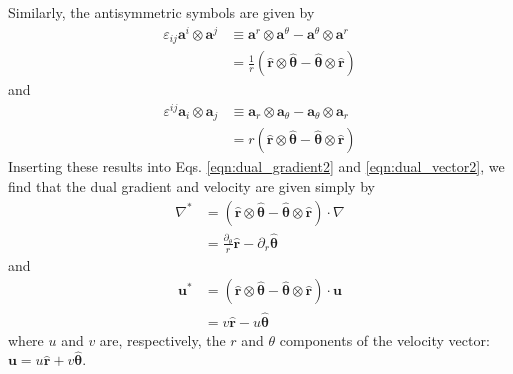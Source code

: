 \documentclass[%
 reprint,
superscriptaddress,
longbibliography,
 amsmath,amssymb,
 prl,
 citeautoscript,
]{revtex4-1}
\begin{document}
Similarly, the antisymmetric symbols are given by
\begin{equation}
\begin{split}
\varepsilon_{ij} {\boldsymbol a}^i \otimes {\boldsymbol a}^j &\equiv {\boldsymbol a}^r \otimes {\boldsymbol a}^{\theta} - {\boldsymbol a}^{\theta} \otimes {\boldsymbol a}^r \\
&= \frac{1}{r} \left( \hat{\boldsymbol r} \otimes \hat{\boldsymbol \theta} - \hat{\boldsymbol \theta} \otimes \hat{\boldsymbol r} \right)
\end{split}
\label{eqn:eij1}
\end{equation}
and
\begin{equation}
\begin{split}
\varepsilon^{ij} {\boldsymbol a}_i \otimes {\boldsymbol a}_j &\equiv {\boldsymbol a}_r \otimes {\boldsymbol a}_{\theta} - {\boldsymbol a}_{\theta} \otimes {\boldsymbol a}_r \\
&= r \left( \hat{\boldsymbol r} \otimes \hat{\boldsymbol \theta} - \hat{\boldsymbol \theta} \otimes \hat{\boldsymbol r} \right)
\end{split}
\label{eqn:eij2}
\end{equation}
Inserting these results into Eqs. \ref{eqn:dual_gradient2} and \ref{eqn:dual_vector2}, we find that the dual gradient and velocity are given simply by
\begin{equation}
\begin{split}
\nabla^* &= \left( \hat{\boldsymbol r} \otimes \hat{\boldsymbol \theta} - \hat{\boldsymbol \theta} \otimes \hat{\boldsymbol r} \right) \cdot \nabla \\
&= \frac{\partial_{\theta}}{r} \hat{\boldsymbol r} - \partial_r \hat{\boldsymbol \theta}
\end{split}
\label{eqn:dual_gradient_final}
\end{equation}
and
\begin{equation}
\begin{split}
{\boldsymbol u}^* &= \left( \hat{\boldsymbol r} \otimes \hat{\boldsymbol \theta} - \hat{\boldsymbol \theta} \otimes \hat{\boldsymbol r} \right) \cdot {\boldsymbol u} \\
&= v \hat{\boldsymbol r} - u \hat{\boldsymbol \theta}
\end{split}
\label{eqn:dual_velcoity_final}
\end{equation}
where $u$ and $v$ are, respectively, the $r$ and $\theta$ components of the velocity vector: ${\boldsymbol u} = u \hat{\boldsymbol r} + v \hat{\boldsymbol \theta}$.
\end{document}
